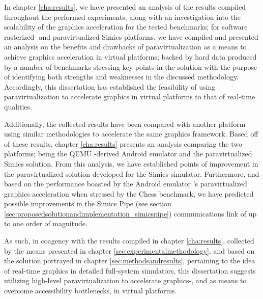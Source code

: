 In chapter \ref{cha:results}, we have presented an analysis of the results compiled throughout the performed experiments; along with an investigation into the scalability of the graphics acceleration for the tested benchmarks; for software rasterized- and paravirtualized Simics platforms.
we have compiled and presented an analysis on the benefits and drawbacks of paravirtualization as a means to achieve graphics acceleration in virtual platforms; backed by hard data produced by a number of benchmarks stressing key points in the solution with the purpose of identifying both strengths and weaknesses in the discussed methodology.
Accordingly, this dissertation has established the feasibility of using paravirtualization to accelerate graphics in virtual platforms to that of real-time qualities.

Additionally, the collected results have been compared with another platform using similar methodologies to accelerate the same graphics framework.
Based off of these results, chapter \ref{cha:results} presents an analysis comparing the two platforms; being the QEMU -derived Android emulator and the paravirtualized Simics solution.
From this analysis, we have established points of improvement in the paravirtualized solution developed for the Simics simulator.
Furthermore, and based on the performance boasted by the Android emulator 's paravirtualized graphics acceleration when stressed by the Chess benchmark, we have predicted possible improvements in the Simics Pipe (see section \ref{sec:proposedsolutionandimplementation_simicspipe}) communications link of up to one order of magnitude.

As such, in coagency with the results compiled in chapter \ref{cha:results}, collected by the means presented in chapter \ref{sec:experimentalmethodology}, and based on the solution portrayed in chapter \ref{sec:methodsandresults}, pertaining to the idea of real-time graphics in detailed full-system simulators, this dissertation suggests utilizing high-level paravirtualization to accelerate graphics-, and as means to overcome accessibility bottlenecks, in virtual platforms.
